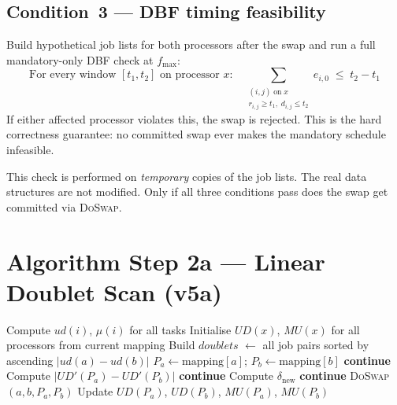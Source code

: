 \documentclass[10pt,twocolumn]{article}
\begin{document}
\subsection*{Condition~3 --- DBF timing feasibility}

Build hypothetical job lists for both processors after the swap and run
a full mandatory-only DBF check at $f_{\max}$:
\[
  \text{For every window } [t_1, t_2] \text{ on processor } x\text{:}\quad
  \sum_{\substack{(i,j)\;\text{on}\;x\\r_{i,j}\geq t_1,\;d_{i,j}\leq t_2}}
  \!\!e_{i,0} \;\leq\; t_2 - t_1
\]
If either affected processor violates this, the swap is rejected.
This is the hard correctness guarantee: no committed swap ever makes
the mandatory schedule infeasible.

This check is performed on \emph{temporary} copies of the job lists.
The real data structures are not modified. Only if all three conditions
pass does the swap get committed via \textsc{DoSwap}.

\section{Algorithm Step 2a --- Linear Doublet Scan (v5a)}

\begin{algorithm}[H]
\caption{Refine Mapping --- Step 2a}
\begin{algorithmic}[1]
\State Compute $ud(i)$, $\mu(i)$ for all tasks
\State Initialise $UD(x)$, $MU(x)$ for all processors from current mapping
\State Build $\mathit{doublets}$ $\leftarrow$ all job pairs sorted by
       ascending $|ud(a)-ud(b)|$
  \State $P_a \leftarrow \text{mapping}[a]$;\;
         $P_b \leftarrow \text{mapping}[b]$
   \textbf{continue} \EndIf
  \State Compute $|UD'(P_a)-UD'(P_b)|$ 
   \textbf{continue} \EndIf
  \State Compute $\delta_{\text{new}}$ 
    \textbf{continue}
  \EndIf
   
    \State \textsc{DoSwap}$(a, b, P_a, P_b)$
    \State Update $UD(P_a)$, $UD(P_b)$, $MU(P_a)$, $MU(P_b)$
  \EndIf
\EndFor {}
\end{algorithmic}
\end{algorithm}
\end{document}
